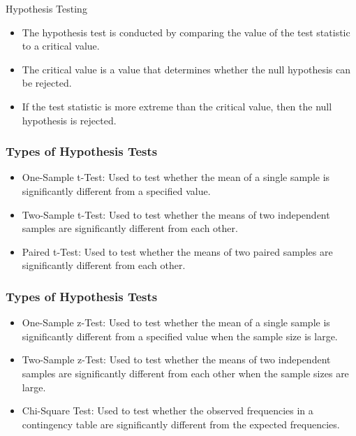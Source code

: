 \documentclass[serif, 9pt, aspectratio=32]{beamer}
\begin{document}
\begin{frame}{Hypothesis Testing}
    \begin{itemize}
        \setlength{\itemsep}{2em}
        \item The hypothesis test is conducted by comparing the value of the test statistic to a critical value.
        \item The critical value is a value that determines whether the null hypothesis can be rejected.
        \item If the test statistic is more extreme than the critical value, then the null hypothesis is rejected.
    \end{itemize}
\end{frame}

\begin{frame}
    \frametitle{Types of Hypothesis Tests}
    \begin{itemize}
        \setlength{\itemsep}{2em}
        \item One-Sample t-Test: Used to test whether the mean of a single sample is significantly different from a specified value.
        \item Two-Sample t-Test: Used to test whether the means of two independent samples are significantly different from each other.
        \item Paired t-Test: Used to test whether the means of two paired samples are significantly different from each other.
    \end{itemize}
\end{frame}

\begin{frame}
    \frametitle{Types of Hypothesis Tests}
    \begin{itemize}
        \setlength{\itemsep}{2em}
        \item One-Sample z-Test: Used to test whether the mean of a single sample is significantly different from a specified value when the sample size is large.
        \item Two-Sample z-Test: Used to test whether the means of two independent samples are significantly different from each other when the sample sizes are large.
        \item Chi-Square Test: Used to test whether the observed frequencies in a contingency table are significantly different from the expected frequencies.
    \end{itemize}
\end{frame}
\end{document}
